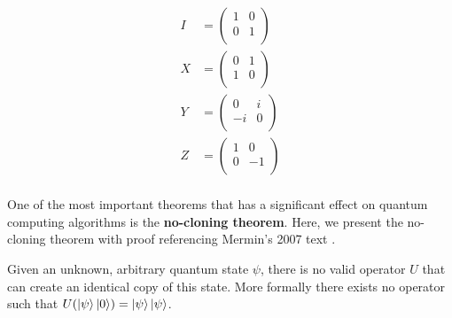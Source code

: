 \begin{align*}
    I &= \begin{pmatrix}
        1 & 0 \\ 
        0 & 1 \\ 
    \end{pmatrix} \\ 
    X &= \begin{pmatrix}
        0 & 1 \\ 
        1 & 0 \\ 
    \end{pmatrix} \\ 
    Y &= \begin{pmatrix}
        0 & i \\ 
        -i & 0 \\ 
    \end{pmatrix} \\ 
    Z &= \begin{pmatrix}
        1 & 0 \\ 
        0 & -1 \\ 
    \end{pmatrix} \\ 
\end{align*}

One of the most important theorems that has a significant effect on quantum computing algorithms is the \textbf{no-cloning theorem}. Here, we present the no-cloning theorem with proof referencing Mermin's 2007 text \cite{merlin}.

\begin{noclonetheorem}{}
    \label{thm:no-cloning-thm}
    Given an unknown, arbitrary quantum state $\psi$, there is no valid operator $U$ that can create an identical copy of this state. More formally there exists no operator such that $U(\ket{\psi} \ket{0}) = \ket{\psi}\ket{\psi}$.
\end{noclonetheorem}

